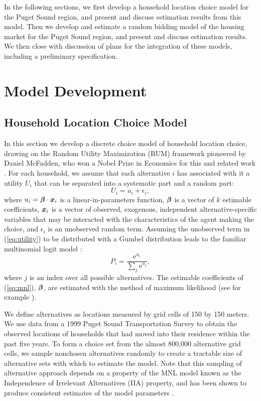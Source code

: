 \documentclass{article}
\newcommand{\vk}[1]{\mbox{\boldmath $#1$}}
\begin{document}
In the following sections, we first develop a household location choice model for the Puget Sound region,
and present and discuss estimation results from this model.  Then we develop and estimate a random bidding
model of the housing market for the Puget Sound region, and present and discuss estimation results.  We then
close with discussion of plans for the integration of these models, including a preliminary specification.

\section{Model Development}
\subsection{Household Location Choice Model}

In this section we develop a discrete choice model of household location choice,
drawing on the Random Utility Maximization (RUM) framework pioneered by Daniel
McFadden, who won a Nobel Prize in Economics for this and related work
\cite{mcfadden-1974,mcfadden-1981}. For each household, we assume that
each alternative $i$ has associated with it a utility $U_i$ that
can be separated into a systematic part and a random part:
\begin{equation}
    U_i = u_i + \epsilon_i,
    \label{eq:utility}
\end{equation}
where $u_i = \vk{\beta}\cdot\vk{x}_i$ is a linear-in-parameters
function, $\vk{\beta}$ is a vector of $k$ estimable coefficients,
$\vk{x}_i$ is a vector of observed, exogenous, independent
alternative-specific variables that may be interacted with the
characteristics of the agent making the choice, and $\epsilon_i$
is an unobserved random term. Assuming the unobserved term in
(\ref{eq:utility}) to be distributed with a Gumbel distribution
leads to the familiar multinomial logit model
\cite{mcfadden-1974,mcfadden-1981}:
\begin{equation}
    P_i = \frac{\mathrm{e}^{u_i}}{\sum_j \mathrm{e}^{u_j}},
    \label{eq:mnl}
\end{equation}
where $j$ is an index over all possible alternatives. The
estimable coefficients of (\ref{eq:mnl}), $\vk{\beta}$, are
estimated with the method of maximum likelihood (see for example
\cite{Greene-2002}).

We define alternatives as locations measured by grid cells of 150 by 150 meters.  We
use data from a 1999 Puget Sound Transportation Survey to obtain the observed locations
of households that had moved into their residence within the past five years.  To form a
choice set from the almost 800,000 alternative grid cells, we sample nonchosen alternatives
randomly to create a tractable size of alternative sets with which to estimate the model.
Note that this sampling of alternative approach depends on a property of the MNL model known
as the Independence of Irrelevant Alternatives (IIA) property, and has been shown to produce
consistent estimates of the model parameters \cite{mcfadden-1978}.
\end{document}
